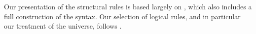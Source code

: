 \bgroup %

\newcommand{\oftype}{\mathord{:}}
\newcommand{\types}{\vdash}
\newcommand{\myType}{\textsf{ type}} %
\newcommand{\cxt}{\textsf{cxt}}
\newcommand{\emptycxt}{[\ ]}
\newcommand{\form}{\textsc{form}}
\newcommand{\intro}{\textsc{intro}}
\newcommand{\appRule}{\textsc{app}}
\newcommand{\elim}{\textsc{elim}}
\newcommand{\comp}{\textsc{comp}}
\newcommand{\Weak}{\mathsf{Wkg}}
\newcommand{\Vble}{\mathsf{Vble}}
\newcommand{\Exch}{\mathsf{Exch}}
\newcommand{\Subst}{\mathsf{Subst}}
\newcommand{\synId}{\mathsf{Id}}
\newcommand{\synPi}{\mathsf{\Pi}}
\newcommand{\synSigma}{\mathsf{\Sigma}}
\newcommand{\synW}{\mathsf{W}}
\newcommand{\synOne}{\mathsf{1}}
\newcommand{\synZero}{\mathsf{0}}
\newcommand{\synPlus}{+}
\newcommand{\synU}{\mathsf{U}}
\newcommand{\el}{\mathsf{El}}
\newcommand{\synrefl}{\mathsf{refl}}
\newcommand{\synlambda}{\mathsf{\lambda}}
\newcommand{\myRefl}{\mathsf{refl}} %
\newcommand{\synsup}{\mathsf{sup}}
\newcommand{\synz}{\mathsf{z}}
\newcommand{\syno}{\mathsf{o}}
\newcommand{\synw}{\mathsf{w}}
\newcommand{\synpi}{\boldsymbol{\pi}}
\newcommand{\synsigma}{\boldsymbol{\sigma}}
\newcommand{\synid}{\mathsf{id}}

\let\syn\mathsf
\newcommand{\synisHIso}{\mathsf{isHIso}}
\newcommand{\synHIso}{\mathsf{HIso}}
\newcommand{\synisEquiv}{\mathsf{isEquiv}}
\newcommand{\synEquiv}{\mathsf{Equiv}}
\newcommand{\synisAdjEquiv}{\mathsf{isAdjEquiv}}
\newcommand{\synAdjEquiv}{\mathsf{AdjEquiv}}
\newcommand{\synHEquivStrux}{\mathsf{HEquivStrux}}
\newcommand{\synHEquiv}{\mathsf{HEquiv}}
\newcommand{\synHFib}{\mathsf{hFib}}
\newcommand{\synHomLHInv}{\mathsf{HomLInv}}
\newcommand{\synHomRHInv}{\mathsf{HomRInv}}
\newcommand{\synLHInv}{\mathsf{LInv}}
\newcommand{\synRHInv}{\mathsf{RInv}}
\newcommand{\synisUnivalent}{\mathsf{isUnivalent}}
\newcommand{\synisContr}{\mathsf{isContr}}
\newcommand{\synisWEq}{\mathsf{isWEq}}
\newcommand{\synWEq}{\mathsf{WEq}}

Our presentation of the structural rules is based largely on
\cite{hofmann:syntax-and-semantics}, which also includes a full construction of
the syntax.  Our selection of logical rules, and in particular our treatment of
the universe, follows \cite{martin-lof:bibliopolis}.


